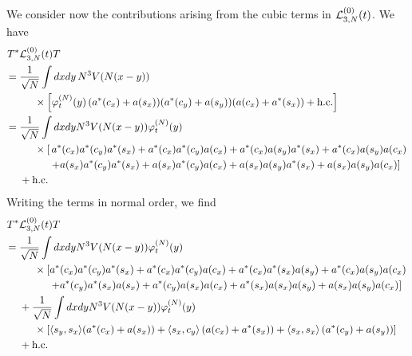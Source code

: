 \documentclass[11pt,a4paper]{article}
\newcommand{\cL}{{\cal L}}
\begin{document}
We consider now the contributions arising from the cubic terms in $\cL^{(0)}_{3,N} (t)$.
We have
\[ \begin{split}
T^* & \cL_{3,N}^{(0)} (t) T \\ = \; & \frac{1}{\sqrt{N}} \int dx dy \, N^3 V(N (x-y)) \\ &\hspace{.5cm} \times \left[ \varphi_t^{(N)} (y) \, ( a^* (c_x) + a (s_x)) (a^* (c_y) + a (s_y)) (a (c_x) + a^* (s_x))  + \text{h.c.} \right] \\ = \; & \frac{1}{\sqrt{N}} \int dx dy N^3 V(N(x-y)) \varphi_t^{(N)} (y) \\ & \hspace{.5cm} 
\times \left[ \, a^* (c_x) a^* (c_y) a^* (s_x) + a^* (c_x) a^* (c_y) a(c_x) + a^* (c_x) a (s_y) a^* (s_x) +a^* (c_x) a (s_y) a (c_x)  \right. \\ & \hspace{1cm} \left. +  a (s_x) a^* (c_y) a^* (s_x) + a (s_x) a^* (c_y) a(c_x) + a (s_x) a (s_y) a^* (s_x) +a (s_x) a (s_y) a (c_x) \right]  \\ &+\text{h.c.} 
\end{split} \]
Writing the terms in normal order, we find
\begin{equation}\label{eq:cub-no} \begin{split} 
T^* &\cL_{3,N}^{(0)} (t) T  \\ = \; &\frac{1}{\sqrt{N}}  \int dx dy N^3 V(N(x-y)) \varphi_t^{(N)} (y) \\ & \hspace{.5cm}  \times \left[ a^* (c_x) a^* (c_y) a^* (s_x) + a^* (c_x) a^* (c_y) a(c_x) + a^* (c_x)  a^* (s_x) a (s_y) +a^* (c_x) a (s_y) a (c_x)  \right. \\ & \hspace{1cm} \left. +   a^* (c_y) a^* (s_x) a (s_x) + a^* (c_y) a (s_x)  a(c_x) + a^* (s_x) a (s_x) a (s_y)  +a (s_x) a (s_y) a (c_x) \right]  \\
&+ \frac{1}{\sqrt{N}} \int dx dy N^3 V (N (x-y)) \varphi_t^{(N)} (y) \\ &\hspace{.5cm} \times  \left[  \langle s_y , s_x \rangle (a^* (c_x) + a (s_x)) + \langle s_x, c_y \rangle \left( a (c_x) + a^* (s_x) \right) + \langle s_x, s_x \rangle \left(a^* (c_y) + a (s_y)\right) \right] 
\\ &+\text{h.c.}
\end{split} \end{equation}
\end{document}
